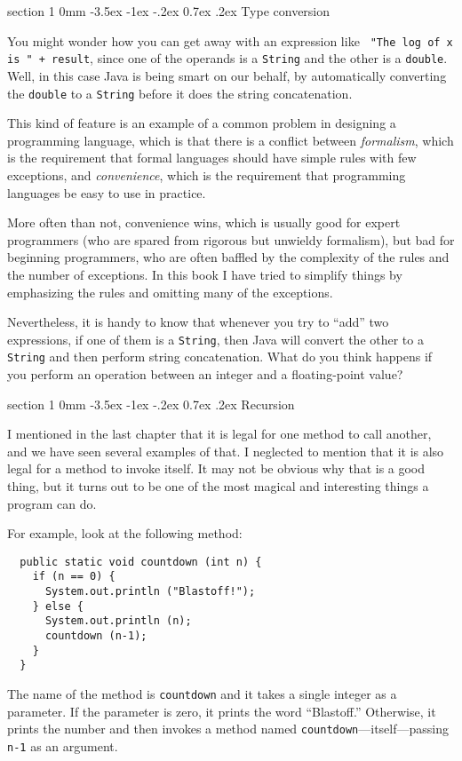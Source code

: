 \documentclass{book}
\makeatletter
\renewcommand{\section}{\@startsection 
    {section} {1} {0mm}%
    {-3.5ex \@plus -1ex \@minus -.2ex}%
    {0.7ex \@plus.2ex}%
    {\normalfont\Large\bfseries}}
\makeatother
\begin{document}
\section {Type conversion}

You might wonder how you can get away with an expression like {\tt
"The log of x is " + result}, since one of the operands is a {\tt String}
and the other is a {\tt double}.  Well, in this case Java is being
smart on our behalf, by automatically converting the {\tt double} to a
{\tt String} before it does the string concatenation.

This kind of feature is an example of a common problem in designing a
programming language, which is that there is a conflict between {\em
formalism}, which is the requirement that formal languages should have
simple rules with few exceptions, and {\em convenience}, which is the
requirement that programming languages be easy to use in practice.

More often than not, convenience wins, which is usually good for
expert programmers (who are spared from rigorous but unwieldy
formalism), but bad for beginning programmers, who are often baffled
by the complexity of the rules and the number of exceptions.  In this
book I have tried to simplify things by emphasizing the rules and
omitting many of the exceptions.

Nevertheless, it is handy to know that whenever you try to ``add'' two
expressions, if one of them is a {\tt String}, then Java will convert the
other to a {\tt String} and then perform string concatenation.  What do you
think happens if you perform an operation between an integer and a
floating-point value?


\section{Recursion}
\label{recursion}

I mentioned in the last chapter that it is legal for one
method to call another, and we have seen several examples of
that.  I neglected to mention that it is also legal for
a method to invoke itself.  It may not be obvious why that
is a good thing, but it turns out
to be one of the most magical and interesting things
a program can do.

For example, look at the following method:

\begin{verbatim}
  public static void countdown (int n) {
    if (n == 0) {
      System.out.println ("Blastoff!");
    } else {
      System.out.println (n);
      countdown (n-1);
    }
  }
\end{verbatim}
%
The name of the method is {\tt countdown} and it takes a single
integer as a parameter.  If the parameter is zero, it prints
the word ``Blastoff.''  Otherwise, it prints the number and
then invokes a method named {\tt countdown}---itself---passing
{\tt n-1} as an argument.
\end{document}
